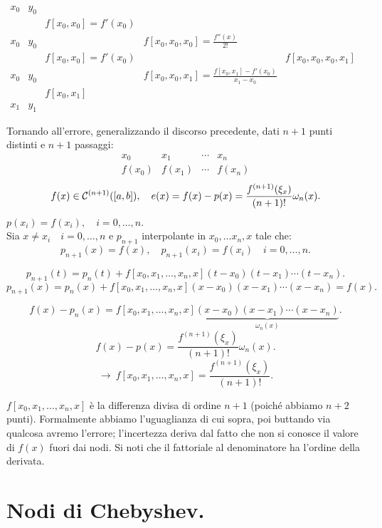 \begin{flushleft}$\begin{array}{ccccc}
x_0 & y_0 &  &  \\
    &     & f[x_0,x_0] = f'(x_0) & \\
x_0 & y_0 &  &  f[x_0,x_0,x_0] = \frac{f''(x)}{2!}\\
    &     & f[x_0,x_0] = f'(x_0) & & f[x_0,x_0,x_0,x_1]\\
x_0 & y_0 &  &  f[x_0,x_0,x_1] = \frac{f[x_0,x_1]- f'(x_0)}{x_1-x_0}\\
    &     &  f[x_0,x_1] & \\
x_1 & y_1 &
\end{array}$\end{flushleft}

Tornando all'errore, generalizzando il discorso precedente, dati $n+1$ punti
distinti e $n+1$ passaggi:
\[\begin{array}{cccc}
x_0 & x_1 & \cdots & x_n \\
f(x_0) & f(x_1) & \cdots & f(x_n)
\end{array}\]
\[f(x) \in \mathcal{C}^{(n+1)}([a,b]), \quad e(x) = f(x) - p(x) =
\frac{f^{(n+1)}(\xi_x)}{(n+1)!}\omega_n(x).\]
$p(x_i) = f(x_i), \quad i=0,\ldots, n$.\\

Sia $x \neq x_i \quad i = 0,\ldots,n$ e $p_{n+1}$ interpolante in $x_0, \ldots
x_n, x$ tale che:
\[
p_{n+1}(x) = f(x), \quad p_{n+1}(x_i) = f(x_i) \quad i=0,\ldots,n.
\]

\[
p_{n+1}(t) = p_n(t) + f[x_0,x_1,\ldots,x_n,x](t-x_0)(t-x_1)\cdots(t-x_n).
\]
\[
p_{n+1}(x) = p_n(x) + f[x_0,x_1,\ldots,x_n,x](x-x_0)(x-x_1)\cdots(x-x_n) = f(x).
\]

\[
f(x) - p_n(x) = f[x_0,x_1,\ldots,x_n,x]
\underbrace{(x-x_0)(x-x_1)\cdots(x-x_n)}_{\omega_n(x)}.
\]
\[f(x)- p(x) = \frac{f^{(n+1)}(\xi_x)}{(n+1)!}\omega_n(x).\]
\[\longrightarrow \ f[x_0,x_1,\ldots,x_n,x]= \frac{f^{(n+1)}(\xi_x)}{(n+1)!}.\]

$f[x_0,x_1,\ldots,x_n,x]$ è la differenza divisa di ordine $n+1$ (poiché
abbiamo $n+2$ punti). Formalmente abbiamo l'uguaglianza di cui sopra, poi
buttando via qualcosa avremo l'errore; l'incertezza deriva dal fatto che
non si conosce il valore di $f(x)$ fuori dai nodi.
Si noti che il fattoriale al denominatore ha l'ordine della derivata.

\section{Nodi di Chebyshev.}


